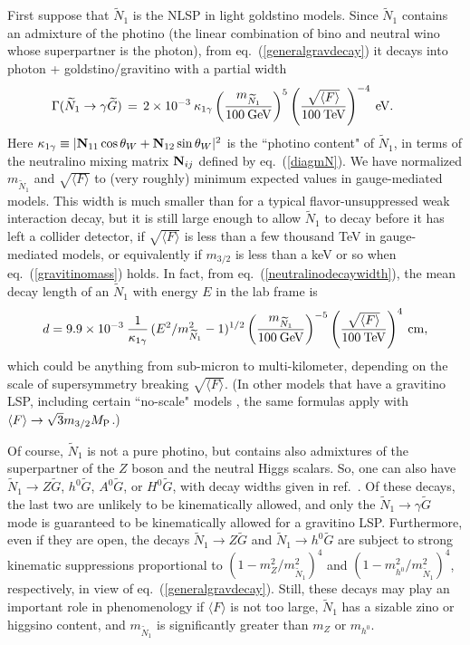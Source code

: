 \documentclass[12pt]{article}
\def\beq{\begin{eqnarray}}
\def\eeq{\end{eqnarray}}
\def\stilde{\widetilde}
\def\G{\stilde G}
\def\NI{\stilde N_1}
\def\MPlanck{M_{\rm P}}
\begin{document}
First suppose that $\stilde N_1$ is the NLSP in light goldstino models. 
Since $\stilde N_1$ contains an admixture of the photino (the linear 
combination of bino and neutral wino whose superpartner is the photon), 
from eq.~(\ref{generalgravdecay}) it decays into photon + 
goldstino/gravitino with a partial width
\beq
\Gamma (\NI \rightarrow \gamma \G ) \,=\,
2\times 10^{-3} \> \kappa_{1\gamma}\left ({m_{\NI}\over 100\>\rm{
GeV}}\right )^5
\left ( {\sqrt{\langle F \rangle}\over 100\>{\rm TeV}} \right )^{-4} \>
{\rm eV}.\qquad{}
\label{neutralinodecaywidth}
\eeq
Here $\kappa_{1\gamma} \equiv |{\bf N}_{11}\cos\theta_W + {\bf N}_{12}\sin 
\theta_W |^2$ is the ``photino content" of $\stilde N_1$, in terms of the 
neutralino mixing matrix ${\bf N}_{ij}$ defined by eq.~(\ref{diagmN}). We 
have normalized $m_{\NI}$ and $\sqrt{\langle F \rangle}$ to (very roughly) 
minimum expected values in gauge-mediated models. This width is much 
smaller than for a typical flavor-unsuppressed weak interaction decay, but 
it is still large enough to allow $\stilde N_1$ to decay before it has 
left a collider detector, if $\sqrt{\langle F\rangle}$ is less than a few 
thousand TeV in gauge-mediated models, or equivalently if $m_{3/2}$ is 
less than a keV or so when eq.~(\ref{gravitinomass}) holds. In fact, from 
eq.~(\ref{neutralinodecaywidth}), the mean decay length of an $\NI$ with 
energy $E$ in the lab frame is
\beq
d = 9.9 \times 10^{-3}\> {1\over \kappa_{1\gamma}}\,
({E^2/ m_{\NI}^2} - 1)^{1/2}
\left ({m_{\NI}\over 100\>\rm{ GeV}}\right )^{-5}
\left({\sqrt{\langle F \rangle}\over 100\>{\rm TeV}} \right )^{4}
\>{\rm cm},
\label{neutralinodecaylength}
\eeq
which could be anything from sub-micron to multi-kilometer, depending on 
the scale of supersymmetry breaking $\sqrt{\langle F \rangle}$. (In other 
models that have a gravitino LSP, including certain ``no-scale" models 
\cite{noscalephotons}, the same formulas apply with ${\langle F \rangle} 
\rightarrow \sqrt{3} m_{3/2} \MPlanck$.)

Of course, $\stilde N_1$ is not a pure photino, but contains also 
admixtures of the superpartner of the $Z$ boson and the neutral Higgs 
scalars. So, one can also have \cite{DDRT} $\NI\rightarrow Z\G$, $h^0\G$, 
$A^0\G$, or $H^0\G$, with decay widths given in ref.~\cite{AKKMM2}. Of 
these decays, the last two are unlikely to be kinematically allowed, and 
only the $\NI \rightarrow \gamma\G$ mode is guaranteed to be kinematically 
allowed for a gravitino LSP. Furthermore, even if they are open, the 
decays $\stilde N_1 \rightarrow Z\G$ and $\stilde N_1 \rightarrow h^0 \G$ 
are subject to strong kinematic suppressions proportional to 
$(1-m_Z^2/m_{\stilde N_1}^2)^4$ and $(1 - m_{h^0}^2/m_{\stilde N_1}^2)^4$, 
respectively, in view of eq.~(\ref{generalgravdecay}). Still, these decays 
may play an important role in phenomenology if ${\langle F\rangle }$ is 
not too large, $\stilde N_1$ has a sizable zino or higgsino content, and 
$m_{\stilde N_1}$ is significantly greater than $m_Z$ or $m_{h^0}$.
\end{document}
